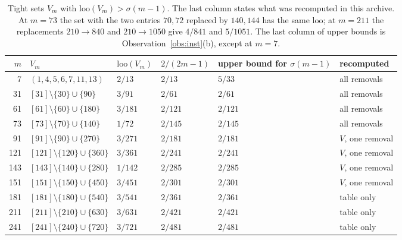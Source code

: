 \documentclass[11pt]{article}
\theoremstyle{remark}
\newcommand{\loo}{\mathrm{loo}}
\begin{document}
\begin{table}[h]
\centering\scriptsize
\begin{tabular}{@{}rlllll@{}}
\toprule
$m$ & $V_m$ & $\loo(V_m)$ & $2/(2m-1)$ & upper bound for $\sigma(m-1)$ & recomputed\\
\midrule
7 & $(1,4,5,6,7,11,13)$ & $2/13$ & $2/13$ & $5/33$ & all removals\\
31 & $[31]\setminus\{30\}\cup\{90\}$ & $3/91$ & $2/61$ & $2/61$ & all removals\\
61 & $[61]\setminus\{60\}\cup\{180\}$ & $3/181$ & $2/121$ & $2/121$ & all removals\\
73 & $[73]\setminus\{70\}\cup\{140\}$ & $1/72$ & $2/145$ & $2/145$ & all removals\\
91 & $[91]\setminus\{90\}\cup\{270\}$ & $3/271$ & $2/181$ & $2/181$ & $V$, one removal\\
121 & $[121]\setminus\{120\}\cup\{360\}$ & $3/361$ & $2/241$ & $2/241$ & $V$, one removal\\
143 & $[143]\setminus\{140\}\cup\{280\}$ & $1/142$ & $2/285$ & $2/285$ & $V$, one removal\\
151 & $[151]\setminus\{150\}\cup\{450\}$ & $3/451$ & $2/301$ & $2/301$ & $V$, one removal\\
181 & $[181]\setminus\{180\}\cup\{540\}$ & $3/541$ & $2/361$ & $2/361$ & table only\\
211 & $[211]\setminus\{210\}\cup\{630\}$ & $3/631$ & $2/421$ & $2/421$ & table only\\
241 & $[241]\setminus\{240\}\cup\{720\}$ & $3/721$ & $2/481$ & $2/481$ & table only\\
\bottomrule
\end{tabular}
\caption{Tight sets $V_m$ with $\loo(V_m)>\sigma(m-1)$. The last column states what was recomputed in this archive. At $m=73$ the set with the two entries $70,72$ replaced by $140,144$ has the same $\loo$; at $m=211$ the replacements $210\to840$ and $210\to1050$ give $4/841$ and $5/1051$. The last column of upper bounds is Observation~\ref{obs:inst}(b), except at $m=7$.}\label{tab:strict}
\end{table}
\end{document}
